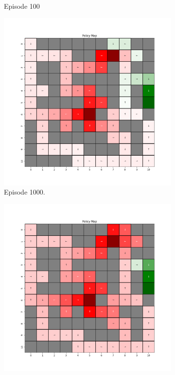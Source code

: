 \documentclass{assignment}
\begin{document}
\begin{figure}[H]
\begin{subfigure}{0.3\textwidth}
    \caption{Episode 100}
    \end{subfigure}
    \begin{subfigure}{0.3\textwidth}
        \includegraphics[width=\textwidth]{figures/policy_td/epsilon_sweep/policy_alpha_0.1_gamma_0.95_epsilon_1.0_iteration_1000.png}
    \caption{Episode 1000.}
    \end{subfigure}\hfill
    \begin{subfigure}{0.3\textwidth}
        \includegraphics[width=\textwidth]{figures/policy_td/epsilon_sweep/policy_alpha_0.1_gamma_0.95_epsilon_1.0_iteration_5000.png}

\end{subfigure}
\end{figure}
\end{document}
